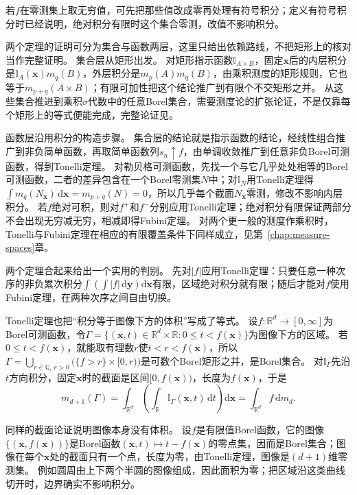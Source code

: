若$f$在零测集上取无穷值，可先把那些值改成零再处理有符号积分；定义有符号积分时已经说明，绝对积分有限时这个集合零测，改值不影响积分。

两个定理的证明可分为集合与函数两层，这里只给出依赖路线，不把矩形上的核对当作完整证明。
集合层从矩形出发。
对矩形指示函数$\mathbb I_{A\times B}$，固定$\bm x$后的内层积分是$\mathbb I_A(\bm x)m_q(B)$，外层积分是$m_p(A)m_q(B)$，由乘积测度的矩形规则，它也等于$m_{p+q}(A\times B)$；有限可加性把这个结论推广到有限个不交矩形之并。
从这些集合推进到乘积$\sigma$代数中的任意Borel集合，需要测度论的扩张论证，不是仅靠每个矩形上的等式便能完成，完整论证见。

函数层沿用积分的构造步骤。
集合层的结论就是指示函数的结论，经线性组合推广到非负简单函数，再取简单函数列$s_n\uparrow f$，由单调收敛推广到任意非负Borel可测函数，得到Tonelli定理。
对勒贝格可测函数，先找一个与它几乎处处相等的Borel可测函数，二者的差异包含在一个Borel零测集$N$中；对$\mathbb I_N$用Tonelli定理得$\int m_q(N_{\bm x})\,\mathrm d\bm x=m_{p+q}(N)=0$，所以几乎每个截面$N_{\bm x}$零测，修改不影响内层积分。
若$f$绝对可积，则对$f^+$和$f^-$分别应用Tonelli定理；绝对积分有限保证两部分不会出现无穷减无穷，相减即得Fubini定理。
对两个更一般的测度作乘积时，Tonelli与Fubini定理在相应的有限覆盖条件下同样成立，见第~\ref{chap:measure-spaces}章。

两个定理合起来给出一个实用的判别。
先对$|f|$应用Tonelli定理：只要任意一种次序的非负累次积分$\int\left(\int|f|\,\mathrm d\bm y\right)\mathrm d\bm x$有限，区域绝对积分就有限；随后才能对$f$使用Fubini定理，在两种次序之间自由切换。

Tonelli定理也把“积分等于图像下方的体积”写成了等式。
设$f:\mathbb R^d\to[0,\infty]$为Borel可测函数，令$\Gamma=\{(\bm x,t)\in\mathbb R^d\times\mathbb R:0\leq t<f(\bm x)\}$为图像下方的区域。
若$0\leq t<f(\bm x)$，就能取有理数$r$使$t<r<f(\bm x)$，所以
$\Gamma=\bigcup_{r\in\mathbb Q,\,r>0}\bigl(\{f>r\}\times[0,r)\bigr)$是可数个Borel矩形之并，是Borel集合。
对$\mathbb I_\Gamma$先沿$t$方向积分，固定$\bm x$时的截面是区间$[0,f(\bm x))$，长度为$f(\bm x)$，于是
\[
 m_{d+1}(\Gamma)=\int_{\mathbb R^d}\left(\int_{\mathbb R}\mathbb I_\Gamma(\bm x,t)\,\mathrm dt\right)\mathrm d\bm x=\int_{\mathbb R^d}f\,\mathrm dm_d.
\]

同样的截面论证说明图像本身没有体积。
设$f$是有限值Borel函数，它的图像$\{(\bm x,f(\bm x))\}$是Borel函数$(\bm x,t)\mapsto t-f(\bm x)$的零点集，因而是Borel集合；图像在每个$\bm x$处的截面只有一个点，长度为零，由Tonelli定理，图像是$(d+1)$维零测集。
例如圆周由上下两个半圆的图像组成，因此面积为零；把区域沿这类曲线切开时，边界确实不影响积分。

